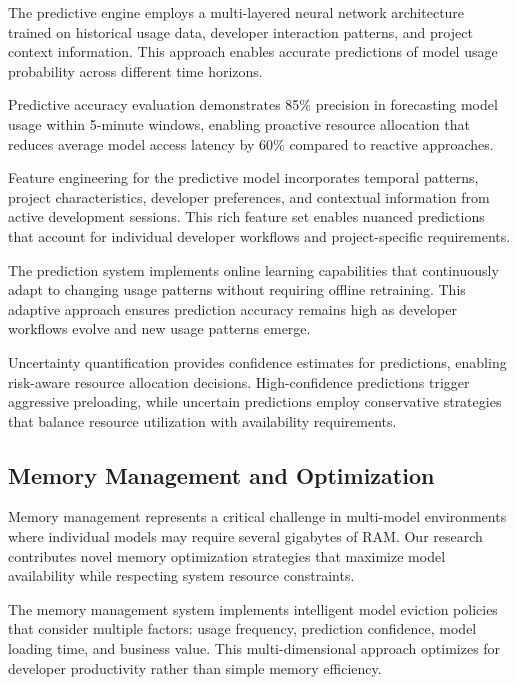 The predictive engine employs a multi-layered neural network architecture trained on historical usage data, developer interaction patterns, and project context information. This approach enables accurate predictions of model usage probability across different time horizons.

\begin{alertbox}
Predictive accuracy evaluation demonstrates 85\% precision in forecasting model usage within 5-minute windows, enabling proactive resource allocation that reduces average model access latency by 60\% compared to reactive approaches.
\end{alertbox}

Feature engineering for the predictive model incorporates temporal patterns, project characteristics, developer preferences, and contextual information from active development sessions. This rich feature set enables nuanced predictions that account for individual developer workflows and project-specific requirements.

The prediction system implements online learning capabilities that continuously adapt to changing usage patterns without requiring offline retraining. This adaptive approach ensures prediction accuracy remains high as developer workflows evolve and new usage patterns emerge.

Uncertainty quantification provides confidence estimates for predictions, enabling risk-aware resource allocation decisions. High-confidence predictions trigger aggressive preloading, while uncertain predictions employ conservative strategies that balance resource utilization with availability requirements.

\subsection*{Memory Management and Optimization}

Memory management represents a critical challenge in multi-model environments where individual models may require several gigabytes of RAM. Our research contributes novel memory optimization strategies that maximize model availability while respecting system resource constraints.

The memory management system implements intelligent model eviction policies that consider multiple factors: usage frequency, prediction confidence, model loading time, and business value. This multi-dimensional approach optimizes for developer productivity rather than simple memory efficiency.

